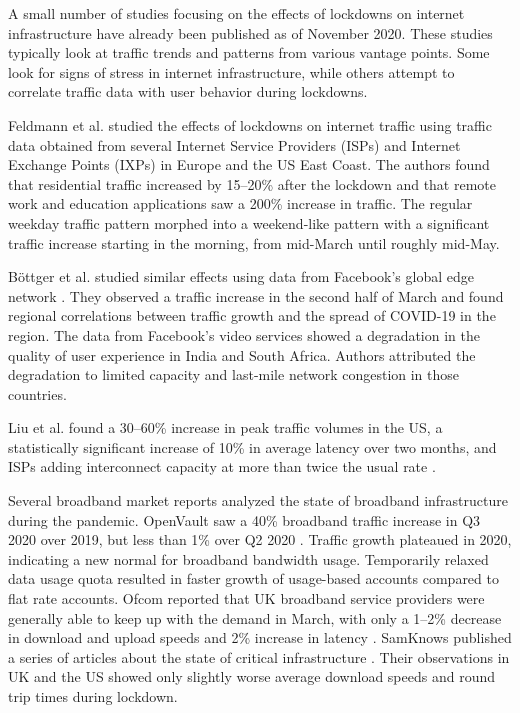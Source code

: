 \documentclass[conference,10pt]{IEEEtran}
\begin{document}


A small number of studies focusing on the effects of lockdowns on internet infrastructure have already been published as of November 2020. These studies typically look at traffic trends and patterns from various vantage points. Some look for signs of stress in internet infrastructure, while others attempt to correlate traffic data with user behavior during lockdowns.

Feldmann et al. studied the effects of lockdowns on internet traffic using traffic data obtained from several Internet Service Providers (ISPs) and Internet Exchange Points (IXPs) in Europe and the US East Coast\cite{feldmann2020lockdown}. The authors found that residential traffic increased by 15--20\% after the lockdown and that remote work and education applications saw a 200\% increase in traffic. The regular weekday traffic pattern morphed into a weekend-like pattern with a significant traffic increase starting in the morning, from mid-March until roughly mid-May.

B\"{o}ttger et al. studied similar effects using data from Facebook's global edge network \cite{bottger2020internet}. They observed a traffic increase in the second half of March and found regional correlations between traffic growth and the spread of COVID-19 in the region. The data from Facebook's video services showed a degradation in the quality of user experience in India and South Africa. Authors attributed the degradation to limited capacity and last-mile network congestion in those countries.

Liu et al. found a 30--60\% increase in peak traffic volumes in the US, a statistically significant increase of 10\% in average latency over two months, and ISPs adding interconnect capacity at more than twice the usual rate \cite{liu2020characterizing}.

Several broadband market reports analyzed the state of broadband infrastructure during the pandemic. OpenVault saw a 40\% broadband traffic increase in Q3 2020 over 2019, but less than 1\% over Q2 2020 \cite{openvault}. Traffic growth plateaued in 2020, indicating a new normal for broadband bandwidth usage. Temporarily relaxed data usage quota resulted in faster growth of usage-based accounts compared to flat rate accounts. Ofcom reported that UK broadband service providers were generally able to keep up with the demand in March, with only a 1--2\% decrease in download and upload speeds and 2\% increase in latency \cite{uk-home-broadband-performance}. SamKnows published a series of articles about the state of critical infrastructure \cite{samknows-cdn,samknows-video-streaming,samknows-video-conferencing,samknows-usa}. Their observations in UK and the US showed only slightly worse average download speeds and round trip times during lockdown.
\end{document}
